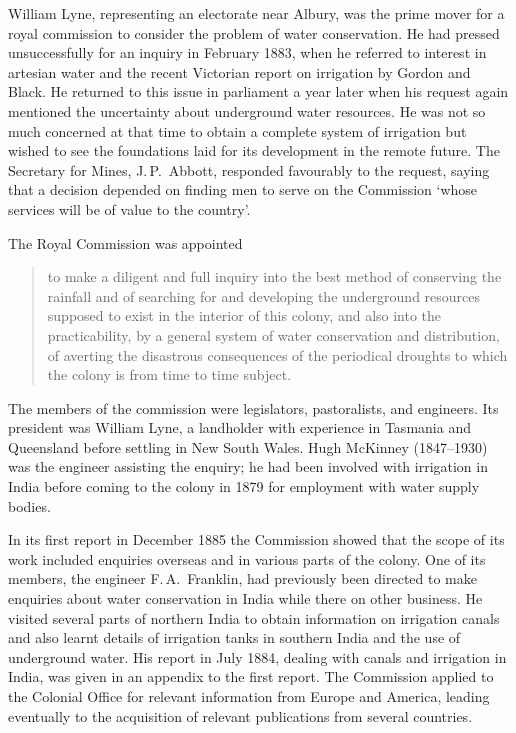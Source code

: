 William Lyne,  representing an electorate near Albury,
was the prime mover for a royal commission to consider the problem of
water conservation.  He had pressed unsuccessfully for an inquiry in
February 1883, when he referred to interest in artesian water and the
recent Victorian report on irrigation by Gordon and Black.  He
returned to this issue in parliament a year later when his request
again mentioned the uncertainty about underground water resources.  He
was not so much concerned at that time to obtain a complete system of
irrigation but wished to see the foundations laid for its development
in the remote future.  The Secretary for Mines, J.\,P.~Abbott,
 responded favourably to the request, saying
that a decision depended on finding men to serve on the Commission
`whose services will be of value to the country'.

The Royal Commission was appointed
\begin{quote}
	to make a diligent and full inquiry into the best method of
	conserving the rainfall and of searching for and developing
	the underground resources supposed to exist in the interior of
	this colo\-ny, and also into the practicability, by a general
	system of water conservation and distribution, of averting the
	disastrous consequ\-en\-ces of the periodical droughts to which
	the colony is from time to time subject.
\end{quote}
The members of the commission were legislators, pastoralists, and
engineers. Its president was William Lyne, a landholder with
experience in Tasmania and Queensland before settling in New South
Wales. Hugh McKinney  (1847--1930) was the
engineer assisting the enquiry; he had been involved with irrigation
in India before coming to the colony in 1879 for employment with water
supply bodies.

In its first report in December 1885 the Commission showed that the
scope of its work included enquiries overseas and in various parts of
the colony.  One of its members, the engineer F.\,A.~Franklin,
 had
previously been directed to make enquiries about water conservation in
India while there on other business.  He visited several parts of
northern India to obtain information on irrigation canals and also
learnt details of irrigation tanks in southern India and the use of
underground water.  His report in July 1884, dealing with canals and
irrigation in India,  was given in an appendix to the
first report.  The Commission applied to the Colonial Office for
relevant information from Europe and America, leading eventually to
the acquisition of relevant publications from several
countries.

